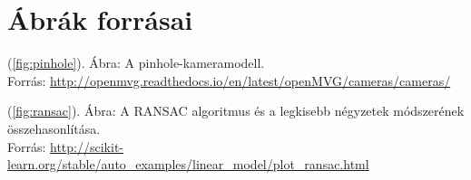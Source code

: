 \documentclass[11pt,a4paper,oneside]{report}             %
\author{\vikszerzo}
\title{\viktitle}
\begin{document}
\singlespacing


\onehalfspacing

\tableofcontents\vfill
%



%








%
%
%


%

\chapter*{Ábrák forrásai}
(\ref{fig:pinhole}). Ábra: A pinhole-kameramodell.\\
Forrás: \url{http://openmvg.readthedocs.io/en/latest/openMVG/cameras/cameras/}

(\ref{fig:ransac}). Ábra: A RANSAC algoritmus és a legkisebb négyzetek módszerének összehasonlítása. \\
Forrás: \url{http://scikit-learn.org/stable/auto_examples/linear_model/plot_ransac.html}




%

\label{page:last}
\end{document}
